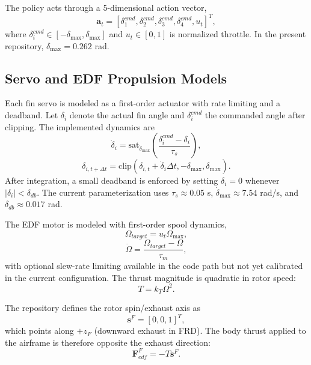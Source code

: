 \documentclass[10pt,twocolumn]{article}
\begin{document}
The policy acts through a 5-dimensional action vector,
\begin{equation}
\mathbf{a}_{t} =
\left[
\delta_{1}^{cmd},
\delta_{2}^{cmd},
\delta_{3}^{cmd},
\delta_{4}^{cmd},
u_{t}
\right]^{T},
\label{eq:action_vector}
\end{equation}
where $\delta_{i}^{cmd}\in[-\delta_{\max},\delta_{\max}]$ and $u_t\in[0,1]$ is normalized throttle. In the present repository, $\delta_{\max}=0.262$ rad.

\subsection{Servo and EDF Propulsion Models}

Each fin servo is modeled as a first-order actuator with rate limiting and a deadband. Let $\delta_i$ denote the actual fin angle and $\delta_i^{cmd}$ the commanded angle after clipping. The implemented dynamics are
\begin{equation}
\dot{\delta}_{i} =
\mathrm{sat}_{\dot{\delta}_{\max}}
\left(
\frac{\delta_{i}^{cmd} - \delta_i}{\tau_s}
\right),
\label{eq:servo_rate}
\end{equation}
\begin{equation}
\delta_{i,t+\Delta t} =
\mathrm{clip}\left(
\delta_{i,t} + \dot{\delta}_{i}\Delta t,
-\delta_{\max},\delta_{\max}
\right).
\label{eq:servo_integrator}
\end{equation}
After integration, a small deadband is enforced by setting $\delta_i=0$ whenever $|\delta_i|<\delta_{db}$. The current parameterization uses $\tau_s \approx 0.05$ s, $\dot{\delta}_{\max}\approx 7.54$ rad/s, and $\delta_{db}\approx 0.017$ rad.

The EDF motor is modeled with first-order spool dynamics,
\begin{equation}
\Omega_{target} = u_t \Omega_{\max},
\label{eq:omega_target}
\end{equation}
\begin{equation}
\dot{\Omega} = \frac{\Omega_{target} - \Omega}{\tau_m},
\label{eq:omega_dynamics}
\end{equation}
with optional slew-rate limiting available in the code path but not yet calibrated in the current configuration. The thrust magnitude is quadratic in rotor speed:
\begin{equation}
T = k_T \Omega^2.
\label{eq:thrust_eq}
\end{equation}

The repository defines the rotor spin/exhaust axis as
\begin{equation}
\mathbf{s}^{F} = [0,0,1]^{T},
\end{equation}
which points along $+z_F$ (downward exhaust in FRD). The body thrust applied to the airframe is therefore opposite the exhaust direction:
\begin{equation}
\mathbf{F}^{F}_{edf} = -T \mathbf{s}^{F}.
\label{eq:body_thrust}
\end{equation}
\end{document}
